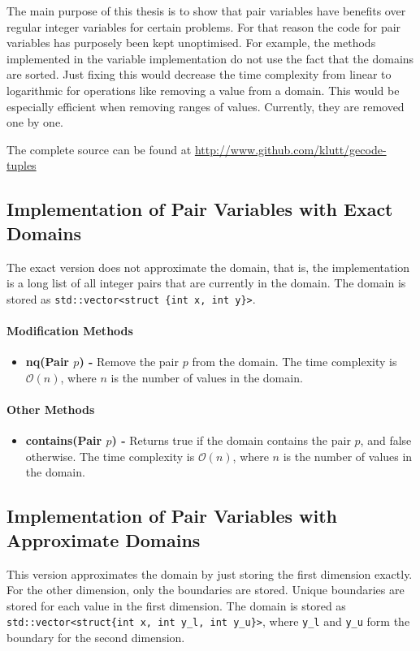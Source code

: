 \documentclass[a4paper,11pt]{article}
\begin{document}
The main purpose of this thesis is to show that pair variables have benefits over regular integer variables for certain problems. For that reason the code for pair variables has purposely been kept unoptimised. For example, the methods implemented in the variable implementation do not use the fact that the domains are sorted. Just fixing this would decrease the time complexity from linear to logarithmic for operations like removing a value from a domain. This would be especially efficient when removing ranges of values. Currently, they are removed one by one.

The complete source can be found at \url{http://www.github.com/klutt/gecode-tuples}

\subsection{Implementation of Pair Variables with Exact Domains}
The exact version does not approximate the domain, that is, the implementation is a long list of all integer pairs that are currently in the domain. The domain is stored as \texttt{std::vector<struct \{int x, int y\}>}. 

\paragraph{Modification Methods}
\begin{itemize}
\item {\textbf{nq(Pair $p$) - }} Remove the pair $p$ from the domain. The time complexity is $\mathcal{O}(n)$, where $n$ is the number of values in the domain. 
\end{itemize}

\paragraph{Other Methods}
\begin{itemize}
\item {\textbf{contains(Pair $p$) - }} Returns true if the domain contains the pair $p$, and false otherwise. The time complexity is  $\mathcal{O}(n)$, where $n$ is the number of values in the domain.
\end{itemize}

\subsection{Implementation of Pair Variables with Approximate Domains}
\label{sec:impapprox}
This version approximates the domain by just storing the first dimension exactly. For the other dimension, only the boundaries are stored. Unique boundaries are stored for each value in the first dimension. The domain is stored as \texttt{std::vector<struct\{int x, int y\_l, int y\_u\}>}, where \texttt{y\_l} and \texttt{y\_u} form the boundary for the second dimension.
\end{document}
